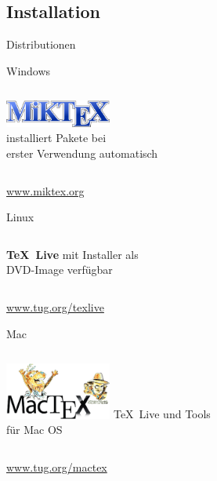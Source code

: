 \subsection{Installation}

\begin{Frame}[t]{Distributionen}
  \begin{Block}{Windows}
    \begin{columns}
      \column{1mm}
      \column{5cm}
      \vskip2pt\par
      \includegraphics[width=3.5cm]{images/miktex}\\
      \column{5cm}
      installiert Pakete bei\\ erster Verwendung automatisch
    \end{columns}
    \url{www.miktex.org}
  \end{Block}

  \begin{Block}{Linux}
    \begin{columns}
      \column{1mm}
      \column{5cm}
      \vskip4pt\par
      \textcolor{texlive}{\Huge\bfseries\TeX\ Live}
      \column{5cm}
      mit Installer als\\ DVD-Image verfügbar
    \end{columns}
    \vskip4pt\par
    \url{www.tug.org/texlive}
  \end{Block}

  \begin{Block}{Mac}
    \begin{columns}
      \column{1mm}
      \column{4.5cm}
      \includegraphics[width=3.5cm]{images/mactex}
      \column{5cm}
      \TeX\ Live und Tools\\ für Mac OS
    \end{columns}
    \url{www.tug.org/mactex}
  \end{Block}
\end{Frame}

